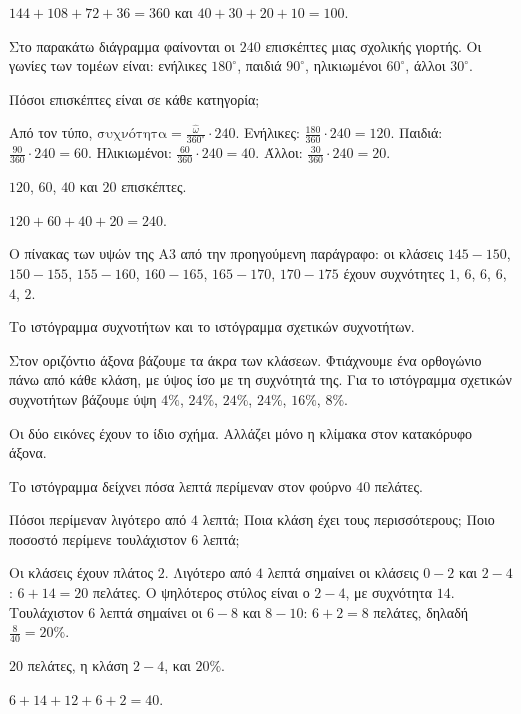 \elegxos $144+108+72+36=360$ και $40+30+20+10=100$.

\tixero Στο παρακάτω διάγραμμα φαίνονται οι $240$ επισκέπτες μιας σχολικής γιορτής. Οι γωνίες των τομέων είναι: ενήλικες $180^\circ$, παιδιά $90^\circ$, ηλικιωμένοι $60^\circ$, άλλοι $30^\circ$.\par
\tithelo Πόσοι επισκέπτες είναι σε κάθε κατηγορία;\par
\possindeo Από τον τύπο, $\text{συχνότητα}=\frac{\hat{\omega}}{360^\circ}\cdot240$. Ενήλικες: $\frac{180}{360}\cdot240=120$. Παιδιά: $\frac{90}{360}\cdot240=60$. Ηλικιωμένοι: $\frac{60}{360}\cdot240=40$. Άλλοι: $\frac{30}{360}\cdot240=20$.\par
\apantisi $120$, $60$, $40$ και $20$ επισκέπτες.

\begin{center}
\end{center}

\elegxos $120+60+40+20=240$.

\tixero Ο πίνακας των υψών της Α$3$ από την προηγούμενη παράγραφο: οι κλάσεις $145-150$, $150-155$, $155-160$, $160-165$, $165-170$, $170-175$ έχουν συχνότητες $1$, $6$, $6$, $6$, $4$, $2$.\par
\tithelo Το ιστόγραμμα συχνοτήτων και το ιστόγραμμα σχετικών συχνοτήτων.\par
\possindeo Στον οριζόντιο άξονα βάζουμε τα άκρα των κλάσεων. Φτιάχνουμε ένα ορθογώνιο πάνω από κάθε κλάση, με ύψος ίσο με τη συχνότητά της. Για το ιστόγραμμα σχετικών συχνοτήτων βάζουμε ύψη $4\%$, $24\%$, $24\%$, $24\%$, $16\%$, $8\%$.\par
\apantisi

\begin{center}
\hfill
{}
\end{center}

\elegxos Οι δύο εικόνες έχουν το ίδιο σχήμα. Αλλάζει μόνο η κλίμακα στον κατακόρυφο άξονα.

\tixero Το ιστόγραμμα δείχνει πόσα λεπτά περίμεναν στον φούρνο $40$ πελάτες.\par
\begin{center}
\end{center}
\tithelo Πόσοι περίμεναν λιγότερο από $4$ λεπτά; Ποια κλάση έχει τους περισσότερους; Ποιο ποσοστό περίμενε τουλάχιστον $6$ λεπτά;\par
\possindeo Οι κλάσεις έχουν πλάτος $2$. Λιγότερο από $4$ λεπτά σημαίνει οι κλάσεις $0-2$ και $2-4$: $6+14=20$ πελάτες. Ο ψηλότερος στύλος είναι ο $2-4$, με συχνότητα $14$. Τουλάχιστον $6$ λεπτά σημαίνει οι $6-8$ και $8-10$: $6+2=8$ πελάτες, δηλαδή $\frac{8}{40}=20\%$.\par
\apantisi $20$ πελάτες, η κλάση $2-4$, και $20\%$.\par
\elegxos $6+14+12+6+2=40$.

